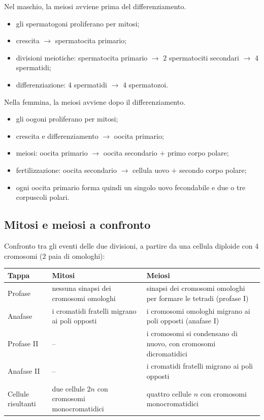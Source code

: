 Nel maschio, la meiosi avviene prima del differenziamento.
\begin{itemize}
  \item gli spermatogoni proliferano per mitosi;
  \item crescita $\rightarrow$ spermatocita primario;
  \item divisioni meiotiche: spermatocita primario $\rightarrow$ 2 spermatociti secondari $\rightarrow$ 4 spermatidi;
  \item differenziazione: 4 spermatidi $\rightarrow$ 4 spermatozoi.
\end{itemize}

Nella femmina, la meiosi avviene dopo il differenziamento.
\begin{itemize}
  \item gli oogoni proliferano per mitosi;
  \item crescita e differenziamento $\rightarrow$ oocita primario;
  \item meiosi: oocita primario $\rightarrow$ oocita secondario $+$ primo corpo polare;
  \item fertilizzazione: oocita secondario $\rightarrow$ cellula uovo $+$ secondo corpo polare;
  \item ogni oocita primario forma quindi un singolo uovo fecondabile e due o tre corpuscoli polari.
\end{itemize}

\subsection{Mitosi e meiosi a confronto}

Confronto tra gli eventi delle due divisioni, a partire da una cellula diploide con 4 cromosomi (2 paia di omologhi):

\begin{table}[htbp]
  \centering
  \small
  \renewcommand{\arraystretch}{1.3}
  \begin{tabularx}{\textwidth}{|l|X|X|}
    \hline
    \textbf{Tappa} & \textbf{Mitosi} & \textbf{Meiosi} \\
    \hline
    Profase & nessuna sinapsi dei cromosomi omologhi & sinapsi dei cromosomi omologhi per formare le tetradi (profase I) \\
    \hline
    Anafase & i cromatidi fratelli migrano ai poli opposti & i cromosomi omologhi migrano ai poli opposti (anafase I) \\
    \hline
    Profase II & -- & i cromosomi si condensano di nuovo, con cromosomi dicromatidici \\
    \hline
    Anafase II & -- & i cromatidi fratelli migrano ai poli opposti \\
    \hline
    Cellule risultanti & due cellule $2n$ con cromosomi monocromatidici & quattro cellule $n$ con cromosomi monocromatidici \\
    \hline
  \end{tabularx}
\end{table}
